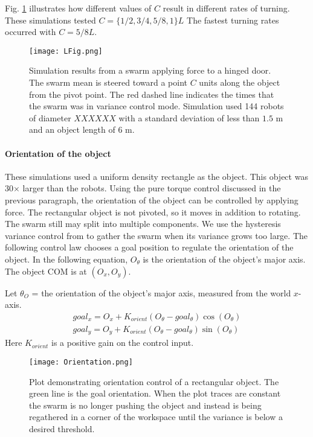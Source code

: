  Fig. \ref{fig:LFig} illustrates how different values of $C$ result in different rates of turning. These simulations tested $C = \{1/2, 3/4, 5/8, 1\}L$  The fastest turning rates occurred with  $C =  5/8L$. 



\begin{figure}
\begin{center}
	\texttt{[image: LFig.png]}
\end{center}
\vspace{-1em}
\caption{\label{fig:LFig}
Simulation results from a swarm applying force to a hinged door. 
The swarm mean is steered toward a point $C$ units along the object from the pivot point. The red dashed line indicates the times that the swarm was in variance control mode.
 Simulation used 144 robots of diameter $XXXXXX$ with a standard deviation of less than $1.5$ m and an object length of $6$ m.
}
\vspace{-1em}
\end{figure}


\paragraph{Orientation of the object}
These simulations used a uniform density rectangle as the object. This object was 30$\times$ larger than the robots.
Using the pure torque control discussed in the previous paragraph, the orientation of the object can be controlled by applying force. 
The rectangular object is not pivoted, so it moves in addition to rotating. 
 The swarm still may split into multiple components.
  We use the hysteresis variance control from \cite{ShahrokhiIROS2015}  to gather the swarm when its variance grows too large. 
  The following control law chooses a goal position to regulate the orientation of the object.  In the following equation, $O_{\theta}$ is the orientation of the object's major axis. The object COM is at $(O_x,O_y)$.

Let $\theta_O$ = the orientation of the object's major axis, measured from the world $x$-axis.
\begin{align}\nonumber
goal_x = O_x +  K_{orient}  (O_{\theta} - goal_\theta ) \cos(O_{\theta}) \\
goal_y = O_y +  K_{orient}  ( O_{\theta} -goal_\theta  ) \sin(O_{\theta})
\end{align}
Here $K_{orient}$ is a positive gain on the control input.  


\begin{figure}
\begin{center}
	\texttt{[image: Orientation.png]}
\end{center}
\vspace{-1em}
\caption{\label{fig:OrientCont}
Plot demonstrating  orientation control of a rectangular object. The green line is the goal orientation.   When the plot traces are constant the swarm is no longer pushing the object and instead is being regathered in a corner of the workspace until the variance is below a desired threshold. 
}
\vspace{-1em}
\end{figure}

